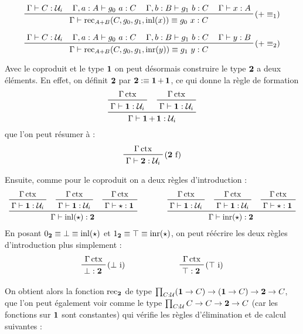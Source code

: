 \documentclass[../../rapport.tex]{subfiles}
\begin{document}
  $$
  \prfinterspace=1.2em
  \prftree[r]{($+ \equiv_1$)}{\Gamma \vdash C : \U_i}{\Gamma, a : A \vdash g_0\ a : C}{\Gamma, b : B \vdash g_1\ b : C}{\Gamma \vdash x : A}
    {\Gamma \vdash \rec_{A+B}(C, g_0, g_1, \inl(x)) \equiv g_0\ x : C}
  $$

  $$
  \prfinterspace=1.2em
  \prftree[r]{($+ \equiv_2$)}{\Gamma \vdash C : \U_i}{\Gamma, a : A \vdash g_0\ a : C}{\Gamma, b : B \vdash g_1\ b : C}{\Gamma \vdash y : B}
    {\Gamma \vdash \rec_{A+B}(C, g_0, g_1, \inr(y)) \equiv g_1\ y : C}
  $$

  \begin{example}[Le type $\2$]
    Avec le coproduit et le type $\operatorname{\textbf{1}}$ on peut désormais construire le type $\2$ a deux éléments.
    En effet, on définit $\2$ par $\operatorname{\textbf{2}} :\equiv \operatorname{\textbf{1}} + \operatorname{\textbf{1}}$, ce qui donne la règle de formation
    $$
    \prfinterspace=1.2em
    \prftree{\prftree{\Gamma \ctx}{\Gamma \vdash \1 : \U_i}}{\prftree{\Gamma \ctx}{\Gamma \vdash \1 : \U_i}}
      {\Gamma \vdash \1 + \1 : \U_i}
    $$
    que l'on peut résumer à :
    $$
    \prftree[r]{($\2$ f)}{\Gamma \ctx}{\Gamma \vdash \2 : \U_i}
    $$

    Ensuite, comme pour le coproduit on a deux règles d'introduction :
    $$
    \prfinterspace=1.2em
    \begin{array}{cc}
      \prftree{\prftree{\Gamma \ctx}{\Gamma \vdash \1 : \U_i}}
	{\prftree{\Gamma \ctx}{\Gamma \vdash \1 : \U_i}}
	{\prftree{\Gamma \ctx}{\Gamma \vdash \star : \1}}
	{\Gamma \vdash \inl(\star) : \2} \hspace{1cm}
      &\prftree{\prftree{\Gamma \ctx}{\Gamma \vdash \1 : \U_i}}
	{\prftree{\Gamma \ctx}{\Gamma \vdash \1 : \U_i}}
	{\prftree{\Gamma \ctx}{\Gamma \vdash \star : \1}}
	  {\Gamma \vdash \inr(\star) : \2}
    \end{array}
    $$
    En posant $0_{\operatorname{\textbf{2}}} \equiv \bot \equiv \operatorname{inl}(\star)$ et $1_{\operatorname{\textbf{2}}} \equiv \top \equiv \operatorname{inr}(\star)$,
    on peut réécrire les deux règles d'introduction plus simplement :
    $$
    \begin{array}{cc}
      \prftree[r]{($\bot$ i)}{\Gamma \ctx}{\bot : \2} \hspace{2cm}
      & \prftree[r]{($\top$ i)}{\Gamma \ctx}{\top : \2}
    \end{array}
    $$

    On obtient alors la fonction $\operatorname{rec}_{\operatorname{\textbf{2}}}$ de type $\prod_{C : \mathcal U}(\operatorname{\textbf{1}} \rightarrow C) \rightarrow (\operatorname{\textbf{1}} \rightarrow C) \rightarrow \operatorname{\textbf{2}} \rightarrow C$,
    que l'on peut également voir comme le type $\prod_{C:\mathcal U}C \rightarrow C \rightarrow \operatorname{\textbf{2}} \rightarrow C$ (car les fonctions sur $\operatorname{\textbf{1}}$ sont constantes)
    qui vérifie les règles d'élimination et de calcul suivantes :


\end{example}
\end{document}
